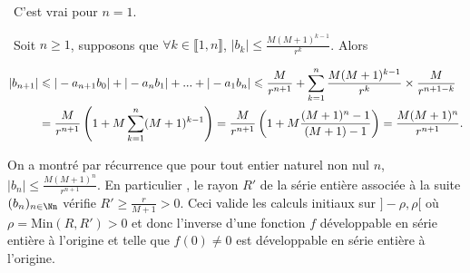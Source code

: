 {\begin{enumerate}
{\textbullet~C'est vrai pour $n=1$.

\textbullet~Soit $n\geqslant1$, supposons que $\forall k\in\llbracket1,n\rrbracket$, $|b_k|\leqslant\frac{M(M+1)^{k-1}}{r^k}$. Alors 

\begin{align*}\ensuremath
\left|b_{n+1}\right|&\leqslant|-a_{n+1}b_0| +|-a_nb_1| + ...+ |-a_1b_n|\leqslant\frac{M}{r^{n+1}}+\sum_{k=1}^{n}\frac{M(M+1)^{k-1}}{r^k}\times\frac{M}{r^{n+1-k}}\\
 &=\frac{M}{r^{n+1}}\left(1+ M\sum_{k=1}^{n}(M+1)^{k-1}\right)=\frac{M}{r^{n+1}}\left(1+ M\frac{(M+1)^n-1}{(M+1)-1}\right)=\frac{M(M+1)^n}{r^{n+1}}.
\end{align*}

On a montré par récurrence que pour tout entier naturel non nul $n$, $|b_n|\leqslant\frac{M(M+1)^n}{r^{n+1}}$. En particulier , le rayon $R'$ de la série entière associée à la suite $(b_n)_{n\in\Nn}$ vérifie $R'\geqslant\frac{r}{M+1}> 0$. Ceci valide les calculs initiaux sur $]-\rho,\rho[$ où $\rho=\text{Min}(R,R')>0$ et donc l'inverse d'une fonction $f$ développable en série entière à l'origine et telle que $f(0)\neq0$ est développable en série entière à l'origine.}
\end{enumerate}
}
